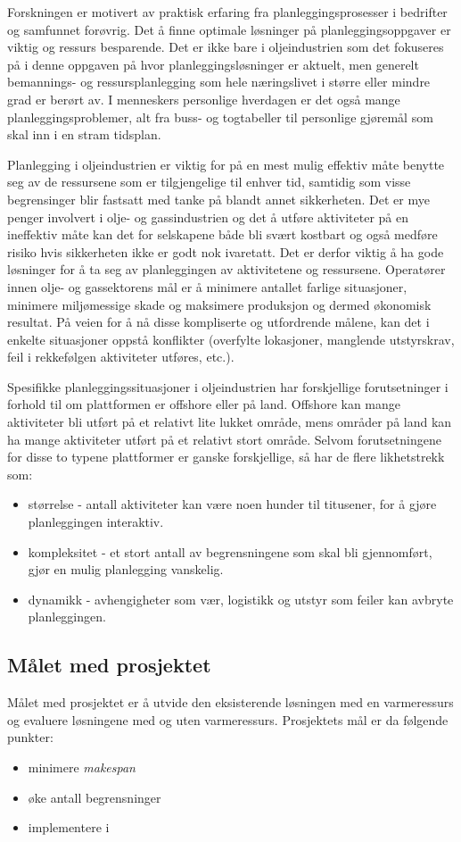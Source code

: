 Forskningen er motivert av praktisk erfaring fra planleggingsprosesser i bedrifter og samfunnet forøvrig. Det å finne optimale løsninger på planleggingsoppgaver er viktig og ressurs besparende. Det er ikke bare i oljeindustrien som det fokuseres på i denne oppgaven på hvor planleggingsløsninger er aktuelt, men generelt bemannings- og ressursplanlegging som hele næringslivet i større eller mindre grad er berørt av. I menneskers personlige hverdagen er det også mange planleggingsproblemer, alt fra buss- og togtabeller til personlige gjøremål som skal inn i en stram tidsplan.

Planlegging i oljeindustrien er viktig for på en mest mulig effektiv måte benytte seg av de ressursene som er tilgjengelige til enhver tid, samtidig som visse begrensinger blir fastsatt med tanke på blandt annet sikkerheten. Det er mye penger involvert i olje- og gassindustrien og det å utføre aktiviteter på en ineffektiv måte kan det for selskapene både bli svært kostbart og også medføre risiko hvis sikkerheten ikke er godt nok ivaretatt. Det er derfor viktig å ha gode løsninger for å ta seg av planleggingen av aktivitetene og ressursene. Operatører innen olje- og gassektorens mål er å minimere antallet farlige situasjoner, minimere miljømessige skade og maksimere produksjon og dermed økonomisk resultat. På veien for å nå disse kompliserte og utfordrende målene, kan det i enkelte situasjoner oppstå konflikter (overfylte lokasjoner, manglende utstyrskrav, feil i rekkefølgen aktiviteter utføres, etc.).

Spesifikke planleggingssituasjoner i oljeindustrien har forskjellige forutsetninger i forhold til om plattformen er offshore eller på land. Offshore kan mange aktiviteter bli utført på et relativt lite lukket område, mens områder på land kan ha mange aktiviteter utført på et relativt stort område. Selvom forutsetningene for disse to typene plattformer er ganske forskjellige, så har de flere likhetstrekk som:
\begin{itemize}
\item størrelse - antall aktiviteter kan være noen hunder til titusener, for å gjøre planleggingen interaktiv.
\item kompleksitet - et stort antall av begrensningene som skal bli gjennomført, gjør en mulig planlegging vanskelig.
\item dynamikk - avhengigheter som vær, logistikk og utstyr som feiler kan avbryte planleggingen.
\end{itemize}

\subsection{Målet med prosjektet}
Målet med prosjektet er å utvide den eksisterende \ilog løsningen med en varmeressurs og evaluere løsningene med og uten varmeressurs. Prosjektets mål er da følgende punkter:
\begin{itemize}
\item minimere \textit{makespan}
\item øke antall begrensninger
\item implementere i \ilog
\end{itemize}

